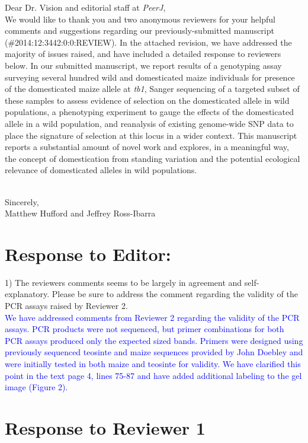 \documentclass[11pt]{article}
\newcommand{\res}[1]{\noindent \textcolor{blue}{{#1}} \\}
\begin{document}
\noindent Dear Dr. Vision and editorial staff at \emph{PeerJ}, \\

We would like to thank you and two anonymous reviewers for your helpful comments and suggestions regarding our previously-submitted manuscript (\#2014:12:3442:0:0:REVIEW).  In the attached revision, we have addressed the majority of issues raised, and have included a detailed response to reviewers below.  In our submitted manuscript, we report results of a genotyping assay surveying several hundred wild and domesticated maize individuals for presence of the domesticated maize allele at \emph{tb1}, Sanger sequencing of a targeted subset of these samples to assess evidence of selection on the domesticated allele in wild populations, a phenotyping experiment to gauge the effects of the domesticated allele in a wild population, and reanalysis of existing genome-wide SNP data to place the signature of selection at this locus in a wider context.  This manuscript reports a substantial amount of novel work and explores, in a meaningful way, the concept of domestication from standing variation and the potential ecological relevance of domesticated alleles in wild populations.\\\

\noindent Sincerely,\\

\noindent Matthew Hufford and Jeffrey Ross-Ibarra

\section*{Response to Editor:}

1) The reviewers comments seems to be largely in agreement and self-explanatory. Please be sure to address the comment regarding the validity of the PCR assays raised by Reviewer 2.\\

\res{We have addressed comments from Reviewer 2 regarding the validity of the PCR assays. PCR products were not sequenced, but primer combinations for both PCR assays produced only the expected sized bands. Primers were designed using previously sequenced teosinte and maize sequences provided by John Doebley and were initially tested in both maize and teosinte for validity.  We have clarified this point in the text page 4, lines 75-87 and have added additional labeling to the gel image (Figure 2).} 

\section*{Response to Reviewer 1}
\end{document}
